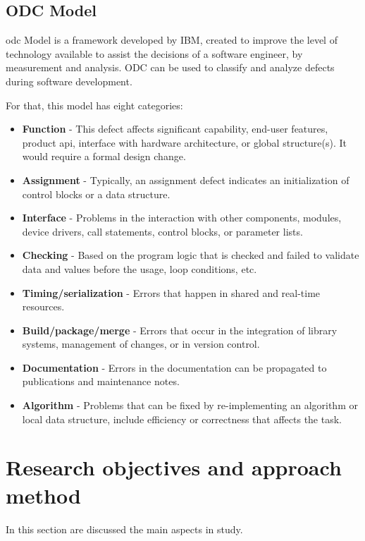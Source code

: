 \clearpage
\subsection{ODC Model}
\acl{odc}\cite{bridge1998orthogonal} Model is a framework developed by IBM\cite{chillarege2004orthogonal}, created to improve the level of technology available to assist the decisions of a software engineer, by measurement and analysis.
ODC can be used to classify and analyze defects during software development.

For that, this model has eight categories:

\begin{itemize}
	\item \textbf{Function} - This defect affects significant capability, end-user features, product \acl{api}, interface with hardware architecture, or global structure(s). It would require a formal design change.
	\item \textbf{Assignment} - Typically, an assignment defect indicates an initialization of control blocks or a data structure.
	\item \textbf{Interface} - Problems in the interaction with other components, modules, device drivers, call statements, control blocks, or parameter lists.
	\item \textbf{Checking} - Based on the program logic that is checked and failed to validate data and values before the usage, loop conditions, etc.
	\item \textbf{Timing/serialization} - Errors that happen in shared and real-time resources.
	\item \textbf{Build/package/merge} - Errors that occur in the integration of library systems, management of changes, or in version control.
	\item \textbf{Documentation} - Errors in the documentation can be propagated to publications and maintenance notes.
	\item \textbf{Algorithm} - Problems that can be fixed by re-implementing an algorithm or local data structure, include efficiency or correctness that affects the task.
\end{itemize}


\newpage
\section{Research objectives and approach method}

In this section are discussed the main aspects in study.

